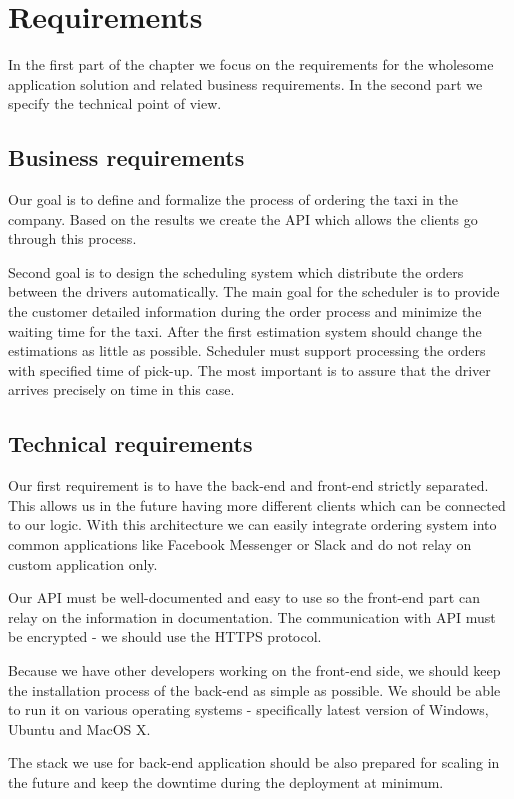 \chapter{Requirements}
In the first part of the chapter we focus on the requirements for the wholesome application solution and related business requirements. In the second part we specify the technical point of view.

\section{Business requirements}
Our goal is to define and formalize the process of ordering the taxi in the company. Based on the results we create the API which allows the clients go through this process. 

Second goal is to design the scheduling system which distribute the orders between the drivers automatically. The main goal for the scheduler is to provide the customer detailed information during the order process and minimize the waiting time for the taxi. After the first estimation system should change the estimations as little as possible. Scheduler must support processing the orders with specified time of pick-up. The most important is to assure that the driver arrives precisely on time in this case.

\section{Technical requirements}
	Our first requirement is to have the back-end and front-end strictly separated. This allows us in the future having more different clients which can be connected to our logic. With this architecture we can easily integrate ordering system into common applications like Facebook Messenger or Slack and do not relay on custom application only.
	
	Our API must be well-documented and easy to use so the front-end part can relay on the information in documentation. The communication with API must be encrypted - we should use the HTTPS protocol. 
	
	Because we have other developers working on the front-end side, we should keep the installation process of the back-end as simple as possible. We should be able to run it on various operating systems - specifically latest version of Windows, Ubuntu and MacOS X.
	
	The stack we use for back-end application should be also prepared for scaling in the future and keep the downtime during the deployment at minimum.


